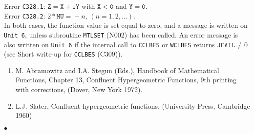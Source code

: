 Error {\tt C328.1}: $\mathtt{Z=X+iY}$ with $\mathtt{X<0}$ and
$\mathtt{Y=0}$. \\
Error {\tt C328.2}: $2*\mathtt{MU=}-n,\,(n=1,2,\ldots)$. \\
In both cases, the function value is set equal to zero,
and a message is written on
{\tt Unit 6}, unless subroutine {\tt MTLSET} (N002) has been called.
An error message is also written on {\tt Unit 6} if the internal call to
{\tt CCLBES} or {\tt WCLBES} returns $\mathtt{JFAIL} \ne 0$
(see Short write-up for {\tt CCLBES} (C309)).
\newpage
\Refer
\begin{enumerate}
\item  M. Abramowitz and I.A. Stegun (Eds.), Handbook
of Mathematical Functions,
Chapter 13, Confluent Hypergeometric Functions,
9th printing with corrections, (Dover, New York 1972).
\item L.J. Slater, Confluent hypergeometric functions, (University Press,
Cambridge 1960)
\end{enumerate}
$\bullet$
